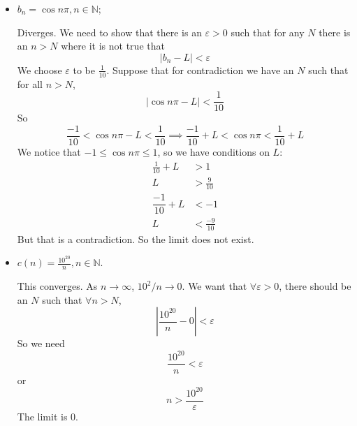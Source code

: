 \documentclass{article}
\begin{document}
\begin{itemize}
        \item $b_{n} = \cos{n\pi}, n \in \mathbb{N}$;
            \begin{answer}
                Diverges. We need to show that there is an $\varepsilon >  0$ such that for any $N$ there is an $n > N$ where it is not true that
                    \begin{equation*}
                        \left\lvert b_{n} - L \right\rvert < \varepsilon
                    \end{equation*}
                We choose $\varepsilon$ to be $\frac{1}{10}$. Suppose that for contradiction we have an $N$ such that for all $n >  N$, 
                    \begin{equation*}
                        \lvert \cos{n\pi} - L \rvert < \frac{1}{10}
                    \end{equation*}
                So 
                    \begin{equation*}
                        \frac{-1}{10} < \cos{n\pi} - L < \frac{1}{10} \implies \frac{-1}{10} + L < \cos{n\pi} <  \frac{1}{10} + L
                    \end{equation*}
                We notice that $-1 \leq \cos{n\pi} \leq 1$, so we have conditions on $L$:
                    \begin{align*}
                        \frac{1}{10} + L   &>               1             \\
                        L                  &> \frac{9}{10}               \\
                        \dfrac{-1}{10} + L &<              -1            \\
                        L                  &<              \frac{-9}{10}   
                    \end{align*}
                But that is a contradiction. So the limit does not exist.
            \end{answer}

        \item $c(n) = \frac{10^{20}}{n}, n \in \mathbb{N}$. 
            \begin{answer}
                This converges. As $n \rightarrow \infty$, $10^{2}/n \rightarrow 0$. We want that $\forall \varepsilon > 0$, there should be an $N$ such that $\forall n > N$, 
                    \begin{equation*}
                        \left\lvert \dfrac{10^{20}}{n} - 0 \right\rvert < \varepsilon
                    \end{equation*}
                So we need
                    \begin{equation*}
                        \dfrac{10^{20}}{n} < \varepsilon
                    \end{equation*}
                or
                    \begin{equation*}
                        n > \dfrac{10^{20}}{\varepsilon}
                    \end{equation*}
                The limit is $0$.
            \end{answer}
    \end{itemize}
\end{document}
